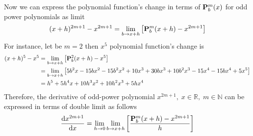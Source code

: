 Now we can express the polynomial function's change in terms of ${\mathbf{P}}\sp{m} \sb{b}(x)$ for odd power polynomials
as limit
\[
    (x+h)^{2m+1} - x^{2m+1} = \lim_{b \to x+h} \left[ {\mathbf{P}}\sp{m} \sb{b}(x+h) - x^{2m+1} \right]
\]
For instance, let be $m=2$ then $x^5$ polynomial function's change is
\begin{equation*}
    \begin{split}
        (x+h)^{5} - x^{5} &= \lim_{b \to x+h} \left[ {\mathbf{P}}\sp{2} \sb{b}(x+h) - x^{5} \right] \\
                          &= \lim_{b \to x+h} \left[ 5 b^2 x - 15 b x^2 - 15 b^2 x^2 + 10 x^3 + 30 b x^3 + 10 b^2 x^3 - 15 x^4 - 15 b x^4 + 5 x^5 \right] \\
                          &= h^5 + 5 h^4 x + 10 h^3 x^2 + 10 h^2 x^3 + 5 h x^4
    \end{split}
\end{equation*}
Therefore, the derivative of odd-power polynomial $x^{2m+1}, \; x\in\mathbb{R}, \; m\in\mathbb{N}$ can be expressed in terms of double limit as follows
\begin{equation*}
    \odv{x^{2m+1}}{x} = \lim_{h \to 0} \lim_{b \to x+h} \left[ \frac{\polynomialP{m}{b}{x+h} - x^{2m+1}}{h} \right]
\end{equation*}
